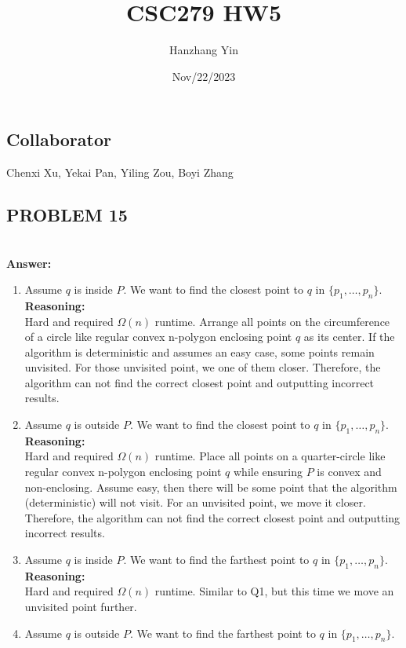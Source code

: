 \documentclass{article}
\title{CSC279 HW5}
\author{Hanzhang Yin}
\date{Nov/22/2023}
\begin{document}
\maketitle

\subsection*{Collaborator}
Chenxi Xu, Yekai Pan, Yiling Zou, Boyi Zhang

\subsection*{PROBLEM 15}
\\
\textbf{Answer: }

\begin{enumerate}
    \item Assume $q$ is inside $P$. We want to find the closest point to $q$ in $\{p_1, \dots, p_n\}$.
    \\
    \textbf{Reasoning: }
    \\
    Hard and required $\Omega(n)$ runtime. Arrange all points on the circumference of a circle like regular convex n-polygon enclosing point $q$ as its center. 
    If the algorithm is deterministic and assumes an easy case, some points remain unvisited. For those unvisited point, we one of them closer.
    Therefore, the algorithm can not find the correct closest point and outputting incorrect results.
    \item Assume $q$ is outside $P$. We want to find the closest point to $q$ in $\{p_1, \dots, p_n\}$.
    \\
    \textbf{Reasoning: }
    \\
    Hard and required $\Omega(n)$ runtime. Place all points on a quarter-circle like regular convex n-polygon enclosing point $q$ while ensuring $P$ is convex and non-enclosing.
    Assume easy, then there will be some point that the algorithm (deterministic) will not visit. For an unvisited point, we move it closer. 
    Therefore, the algorithm can not find the correct closest point and outputting incorrect results.
    \item Assume $q$ is inside $P$. We want to find the farthest point to $q$ in $\{p_1, \dots, p_n\}$.
    \\
    \textbf{Reasoning: }
    \\
    Hard and required $\Omega(n)$ runtime. Similar to Q1, but this time we move an unvisited point further.
    \item Assume $q$ is outside $P$. We want to find the farthest point to $q$ in $\{p_1, \dots, p_n\}$.

\end{enumerate}
\end{document}
